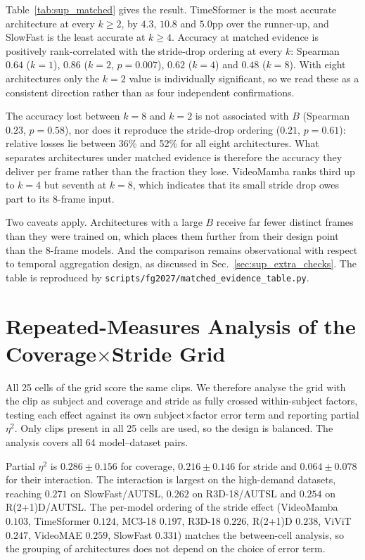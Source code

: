 \documentclass[a4paper, 10pt, conference, onecolumn]{ieeeconf}
\begin{document}
Table~\ref{tab:sup_matched} gives the result. TimeSformer is the most accurate
architecture at every $k\geq2$, by $4.3$, $10.8$ and $5.0$pp over the runner-up,
and SlowFast is the least accurate at $k\geq4$. Accuracy at matched evidence is
positively rank-correlated with the stride-drop ordering at every $k$: Spearman
$0.64$ ($k{=}1$), $0.86$ ($k{=}2$, $p{=}0.007$), $0.62$ ($k{=}4$) and $0.48$
($k{=}8$). With eight architectures only the $k{=}2$ value is individually
significant, so we read these as a consistent direction rather than as four
independent confirmations.

The accuracy lost between $k{=}8$ and $k{=}2$ is not associated with $B$
(Spearman $0.23$, $p{=}0.58$), nor does it reproduce the stride-drop ordering
($0.21$, $p{=}0.61$): relative losses lie between 36\% and 52\% for all eight
architectures. What separates architectures under matched evidence is therefore
the accuracy they deliver per frame rather than the fraction they lose.
VideoMamba ranks third up to $k{=}4$ but seventh at $k{=}8$, which indicates
that its small stride drop owes part to its 8-frame input.

Two caveats apply. Architectures with a large $B$ receive far fewer distinct
frames than they were trained on, which places them further from their design
point than the 8-frame models. And the comparison remains observational with
respect to temporal aggregation design, as discussed in
Sec.~\ref{sec:sup_extra_checks}. The table is reproduced by
\texttt{scripts/fg2027/matched\_evidence\_table.py}.

\section{Repeated-Measures Analysis of the Coverage\texorpdfstring{$\times$}{x}Stride Grid}
\label{sec:sup_rmanova}

All 25 cells of the grid score the same clips. We therefore analyse the grid
with the clip as subject and coverage and stride as fully crossed within-subject
factors, testing each effect against its own subject$\times$factor error term
and reporting partial $\eta^2$. Only clips present in all 25 cells are used, so
the design is balanced. The analysis covers all 64 model--dataset pairs.

Partial $\eta^2$ is $0.286\pm0.156$ for coverage, $0.216\pm0.146$ for stride and
$0.064\pm0.078$ for their interaction. The interaction is largest on the
high-demand datasets, reaching $0.271$ on SlowFast/AUTSL, $0.262$ on
R3D-18/AUTSL and $0.254$ on R(2+1)D/AUTSL. The per-model ordering of the
stride effect (VideoMamba $0.103$, TimeSformer $0.124$, MC3-18 $0.197$, R3D-18 $0.226$, R(2+1)D
$0.238$, ViViT $0.247$, VideoMAE $0.259$, SlowFast $0.331$) matches the
between-cell analysis, so the grouping of architectures does not depend on the
choice of error term.
\end{document}
